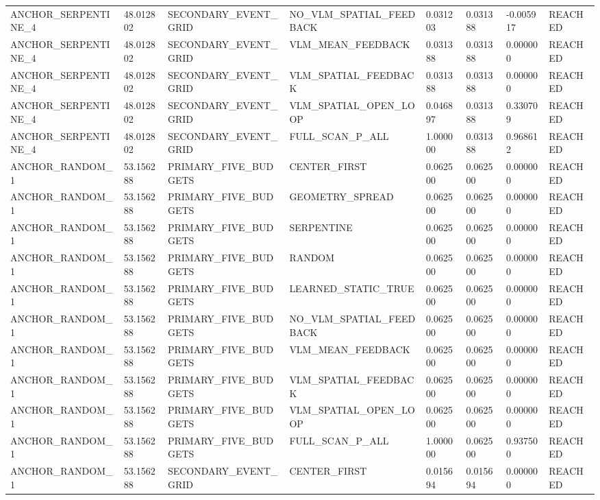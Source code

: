 \begin{tabular}{llllllll}
ANCHOR\_SERPENTINE\_4 & 48.012802 & SECONDARY\_EVENT\_GRID & NO\_VLM\_SPATIAL\_FEEDBACK & 0.031203 & 0.031388 & -0.005917 & REACHED \\
ANCHOR\_SERPENTINE\_4 & 48.012802 & SECONDARY\_EVENT\_GRID & VLM\_MEAN\_FEEDBACK & 0.031388 & 0.031388 & 0.000000 & REACHED \\
ANCHOR\_SERPENTINE\_4 & 48.012802 & SECONDARY\_EVENT\_GRID & VLM\_SPATIAL\_FEEDBACK & 0.031388 & 0.031388 & 0.000000 & REACHED \\
ANCHOR\_SERPENTINE\_4 & 48.012802 & SECONDARY\_EVENT\_GRID & VLM\_SPATIAL\_OPEN\_LOOP & 0.046897 & 0.031388 & 0.330709 & REACHED \\
ANCHOR\_SERPENTINE\_4 & 48.012802 & SECONDARY\_EVENT\_GRID & FULL\_SCAN\_P\_ALL & 1.000000 & 0.031388 & 0.968612 & REACHED \\
ANCHOR\_RANDOM\_1 & 53.156288 & PRIMARY\_FIVE\_BUDGETS & CENTER\_FIRST & 0.062500 & 0.062500 & 0.000000 & REACHED \\
ANCHOR\_RANDOM\_1 & 53.156288 & PRIMARY\_FIVE\_BUDGETS & GEOMETRY\_SPREAD & 0.062500 & 0.062500 & 0.000000 & REACHED \\
ANCHOR\_RANDOM\_1 & 53.156288 & PRIMARY\_FIVE\_BUDGETS & SERPENTINE & 0.062500 & 0.062500 & 0.000000 & REACHED \\
ANCHOR\_RANDOM\_1 & 53.156288 & PRIMARY\_FIVE\_BUDGETS & RANDOM & 0.062500 & 0.062500 & 0.000000 & REACHED \\
ANCHOR\_RANDOM\_1 & 53.156288 & PRIMARY\_FIVE\_BUDGETS & LEARNED\_STATIC\_TRUE & 0.062500 & 0.062500 & 0.000000 & REACHED \\
ANCHOR\_RANDOM\_1 & 53.156288 & PRIMARY\_FIVE\_BUDGETS & NO\_VLM\_SPATIAL\_FEEDBACK & 0.062500 & 0.062500 & 0.000000 & REACHED \\
ANCHOR\_RANDOM\_1 & 53.156288 & PRIMARY\_FIVE\_BUDGETS & VLM\_MEAN\_FEEDBACK & 0.062500 & 0.062500 & 0.000000 & REACHED \\
ANCHOR\_RANDOM\_1 & 53.156288 & PRIMARY\_FIVE\_BUDGETS & VLM\_SPATIAL\_FEEDBACK & 0.062500 & 0.062500 & 0.000000 & REACHED \\
ANCHOR\_RANDOM\_1 & 53.156288 & PRIMARY\_FIVE\_BUDGETS & VLM\_SPATIAL\_OPEN\_LOOP & 0.062500 & 0.062500 & 0.000000 & REACHED \\
ANCHOR\_RANDOM\_1 & 53.156288 & PRIMARY\_FIVE\_BUDGETS & FULL\_SCAN\_P\_ALL & 1.000000 & 0.062500 & 0.937500 & REACHED \\
ANCHOR\_RANDOM\_1 & 53.156288 & SECONDARY\_EVENT\_GRID & CENTER\_FIRST & 0.015694 & 0.015694 & 0.000000 & REACHED \\

\end{tabular}
